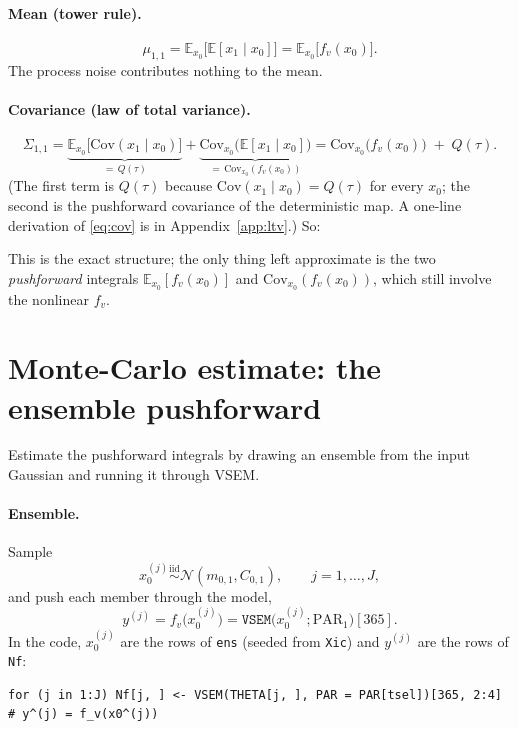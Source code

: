 \documentclass[11pt]{article}
\newcommand{\code}[1]{\texttt{#1}}
\newcommand{\E}{\mathbb{E}}
\newcommand{\Cov}{\mathrm{Cov}}
\newcommand{\Norm}{\mathcal{N}}
\begin{document}
\paragraph{Mean (tower rule).}
\begin{equation}
\label{eq:mean}
\mu_{1,1}=\E_{x_0}\!\big[\E[x_1\mid x_0]\big]=\E_{x_0}\!\big[f_v(x_0)\big].
\end{equation}
The process noise contributes nothing to the mean.

\paragraph{Covariance (law of total variance).}
\begin{equation}
\label{eq:cov}
\Sigma_{1,1}
=\underbrace{\E_{x_0}\!\big[\Cov(x_1\mid x_0)\big]}_{=\,Q(\tau)}
+\underbrace{\Cov_{x_0}\!\big(\E[x_1\mid x_0]\big)}_{=\,\Cov_{x_0}(f_v(x_0))}
= \Cov_{x_0}\!\big(f_v(x_0)\big)\;+\;Q(\tau).
\end{equation}
(The first term is $Q(\tau)$ because $\Cov(x_1\mid x_0)=Q(\tau)$ for every $x_0$; the
second is the pushforward covariance of the deterministic map. A one-line derivation of
\eqref{eq:cov} is in Appendix~\ref{app:ltv}.) So:
\begin{center}
\end{center}
This is the exact structure; the only thing left approximate is the two
\emph{pushforward} integrals $\E_{x_0}[f_v(x_0)]$ and $\Cov_{x_0}(f_v(x_0))$, which still
involve the nonlinear $f_v$.

\section{Monte-Carlo estimate: the ensemble pushforward}
\label{sec:mc}

Estimate the pushforward integrals by drawing an ensemble from the input Gaussian and
running it through VSEM.

\paragraph{Ensemble.} Sample
\begin{equation}
\label{eq:draw}
x_0^{(j)}\stackrel{\text{iid}}{\sim}\Norm(m_{0,1},C_{0,1}),\qquad j=1,\dots,J,
\end{equation}
and push each member through the model,
\begin{equation}
\label{eq:push}
y^{(j)}=f_v\!\big(x_0^{(j)}\big)=\code{VSEM}\big(x_0^{(j)};\text{PAR}_1\big)[365].
\end{equation}
In the code, $x_0^{(j)}$ are the rows of \code{ens} (seeded from \code{Xic}) and
$y^{(j)}$ are the rows of \code{Nf}:
\begin{lstlisting}
for (j in 1:J) Nf[j, ] <- VSEM(THETA[j, ], PAR = PAR[tsel])[365, 2:4]  # y^(j) = f_v(x0^(j))
\end{lstlisting}
\end{document}

